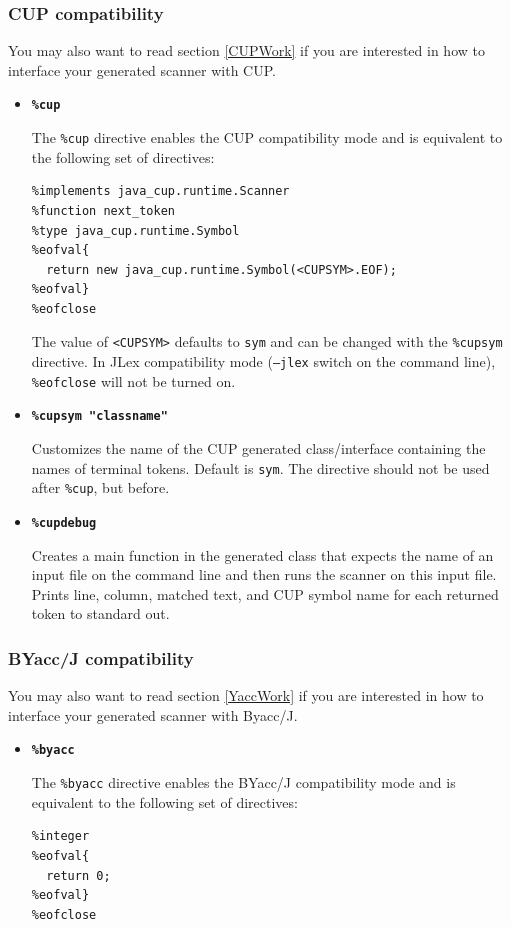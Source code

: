 \documentclass[11pt]{scrartcl}
\begin{document}
\subsubsection{CUP compatibility\label{CupMode}}
You may also want to read section \ref{CUPWork} 
if you are interested in how to interface your generated
scanner with CUP.
\begin{itemize}
\item
{\bf \texttt{\%cup}}

The \texttt{\%cup} directive enables the CUP compatibility mode and is equivalent
to the following set of directives:

\begin{verbatim}
%implements java_cup.runtime.Scanner
%function next_token
%type java_cup.runtime.Symbol
%eofval{
  return new java_cup.runtime.Symbol(<CUPSYM>.EOF);
%eofval}
%eofclose
\end{verbatim}

The value of \texttt{<CUPSYM>} defaults to \texttt{sym} and can be
changed with the \texttt{\%cupsym} directive. In JLex compatibility
mode (\texttt{--jlex} switch on the command line), \texttt{\%eofclose}
will not be turned on.

\item
{\bf \texttt{\%cupsym "classname"}}

Customizes the name of the CUP generated class/interface 
containing the names of terminal tokens. Default is \texttt{sym}.
The directive should not be used after \texttt{\%cup}, but before.

\item
{\bf \texttt{\%cupdebug}}

Creates a main function in the generated class that expects the name
of an input file on the command line and then runs the scanner on this
input file. Prints line, column, matched text, and CUP symbol name for
each returned token to standard out.

\end{itemize}

\subsubsection{BYacc/J compatibility\label{YaccMode}}
You may also want to read section \ref{YaccWork} 
if you are interested in how to interface your generated
scanner with Byacc/J.
\begin{itemize}
\item
{\bf \texttt{\%byacc}}

The \texttt{\%byacc} directive enables the BYacc/J compatibility mode and is equivalent
to the following set of directives:

\begin{verbatim}
%integer
%eofval{
  return 0;
%eofval}
%eofclose
\end{verbatim}

\end{itemize}
\end{document}
